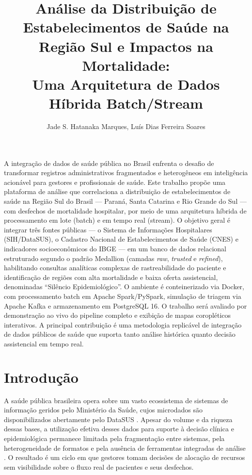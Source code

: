 \documentclass[12pt]{article}
\title{Análise da Distribuição de Estabelecimentos de Saúde na Região Sul
  e Impactos na Mortalidade:\\Uma Arquitetura de Dados Híbrida Batch/Stream}
\author{Jade S. Hatanaka Marques\inst{1}, Luís Dias Ferreira Soares\inst{1}}
\begin{document}
\maketitle

\begin{resumo}
A integração de dados de saúde pública no Brasil enfrenta o desafio de
transformar registros administrativos fragmentados e heterogêneos em
inteligência acionável para gestores e profissionais de saúde. Este trabalho
propõe uma plataforma de análise que correlaciona a distribuição de
estabelecimentos de saúde na Região Sul do Brasil — Paraná, Santa Catarina e
Rio Grande do Sul — com desfechos de mortalidade hospitalar, por meio de uma
arquitetura híbrida de processamento em lote (batch) e em tempo real (stream).
O objetivo geral é integrar três fontes públicas — o Sistema de Informações
Hospitalares (SIH/DataSUS), o Cadastro Nacional de Estabelecimentos de Saúde
(CNES) e indicadores socioeconômicos do IBGE — em um banco de dados relacional
estruturado segundo o padrão Medallion (camadas \textit{raw}, \textit{trusted}
e \textit{refined}), habilitando consultas analíticas complexas de
rastreabilidade do paciente e identificação de regiões com alta mortalidade e
baixa oferta assistencial, denominadas ``Silêncio Epidemiológico''. O ambiente
é conteinerizado via Docker, com processamento batch em Apache Spark/PySpark,
simulação de triagem via Apache Kafka e armazenamento em PostgreSQL 16. O
trabalho será avaliado por demonstração ao vivo do pipeline completo e exibição
de mapas coropléticos interativos. A principal contribuição é uma metodologia
replicável de integração de dados públicos de saúde que suporta tanto análise
histórica quanto decisão assistencial em tempo real.
\end{resumo}


\section{Introdução}

A saúde pública brasileira opera sobre um vasto ecossistema de sistemas de
informação geridos pelo Ministério da Saúde, cujos microdados são disponibilizados
abertamente pelo DataSUS \cite{datasus2024}. Apesar do volume e da riqueza dessas
bases, a utilização efetiva desses dados para suporte à decisão clínica e
epidemiológica permanece limitada pela fragmentação entre sistemas, pela
heterogeneidade de formatos e pela ausência de ferramentas integradas de análise
\cite{lima2019}. O resultado é um ciclo em que gestores tomam decisões de
alocação de recursos sem visibilidade sobre o fluxo real de pacientes e seus
desfechos.
\end{document}
